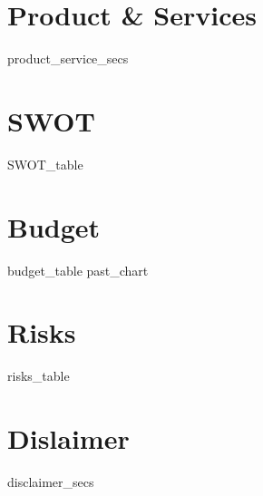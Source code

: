 \documentclass[11pt]{article}
\begin{document}
\newpage{}
\section{Product \& Services}
{{ product_service_secs }}

\newpage{}
\section{SWOT}
{{ SWOT_table }}

\section{Budget}

{{ budget_table }}
{{ past_chart }}

\newpage{}
\section{Risks}
{{ risks_table }}

\newpage{}
\section{Dislaimer}
{{ disclaimer_secs }}
\end{document}
